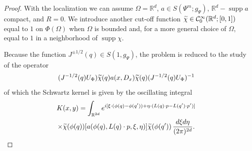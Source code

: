 \documentclass[10pt]{amsart}
\theoremstyle{definition}\newtheorem{defi}[theo]{Definition}\newtheorem{rema}[theo]{Remark}\newtheorem{exam}[theo]{Example}\newtheorem{exem}[theo]{Example}\newtheorem{nota}[theo]{Notation}
\newcommand{\R}{\mathbb{R}}
\newcommand{\clC}{\mathcal{C}}
\DeclareMathOperator{\suppp}{supp}
\let\oldtilde\tilde
\renewcommand*{\tilde}[1]{\mathchoice{\widetilde{#1}}{\widetilde{#1}}{\oldtilde{#1}}{\oldtilde{#1}}}
\begin{document}
\begin{proof}
With the localization we can assume $\Omega=\R^{d}$, $a\in S(\Psi^{m};g_{\Psi})$, $\R^{d}-\suppp a$ compact, and $R=0$. We introduce another cut-off function $\tilde{\chi}\in \clC^{\infty}_{0}(\R^{d};[0,1])$ equal to $1$ on $\Phi(\Omega)$ when $\Omega$ is bounded and, for a more general choice of $\Omega$, equal to $1$ in a neighborhood of $\suppp\chi$.

Because the function $J^{\pm 1/2}(q)\in S(1,g_{\Psi})$, the problem is reduced to the study of the operator
\[
(J^{-1/2}(q)U_{\Phi})\tilde{\chi}(q)a(x,D_{x})\tilde{\chi}(q)(J^{-1/2}(q)U_{\Phi})^{-1}
\]
of which the Schwartz kernel is given by the oscillating integral
\begin{multline*}
K(x,y)=\int_{\R^{2d}}e^{i[\xi\cdot (\phi(q)-\phi(q'))+\eta\cdot(L(q)\cdot p-L(q')\cdot p')]}\\
\times
\tilde{\chi}(\phi(q))[a(\phi(q),L(q)\cdot p,\xi,\eta)]\tilde{\chi}(\phi(q'))\,\frac{d\xi d\eta}{(2\pi)^{2d}}.
\end{multline*}


\end{proof}
\end{document}
